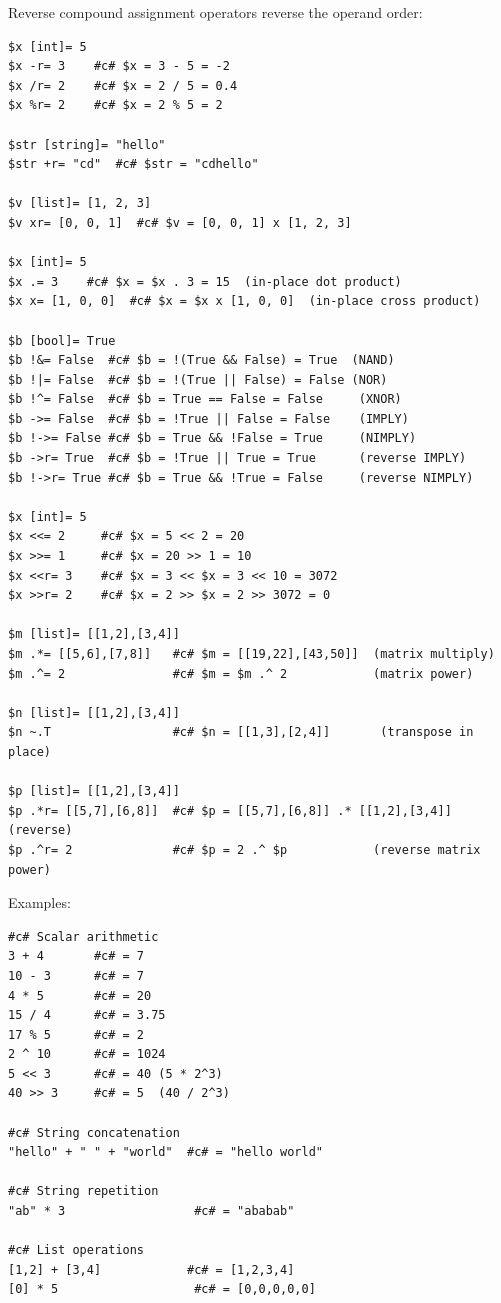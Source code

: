 \documentclass{report}
\begin{document}
Reverse compound assignment operators reverse the operand order:
\begin{verbatim}
$x [int]= 5
$x -r= 3    #c# $x = 3 - 5 = -2
$x /r= 2    #c# $x = 2 / 5 = 0.4
$x %r= 2    #c# $x = 2 % 5 = 2

$str [string]= "hello"
$str +r= "cd"  #c# $str = "cdhello"

$v [list]= [1, 2, 3]
$v xr= [0, 0, 1]  #c# $v = [0, 0, 1] x [1, 2, 3]

$x [int]= 5
$x .= 3    #c# $x = $x . 3 = 15  (in-place dot product)
$x x= [1, 0, 0]  #c# $x = $x x [1, 0, 0]  (in-place cross product)

$b [bool]= True
$b !&= False  #c# $b = !(True && False) = True  (NAND)
$b !|= False  #c# $b = !(True || False) = False (NOR)
$b !^= False  #c# $b = True == False = False     (XNOR)
$b ->= False  #c# $b = !True || False = False    (IMPLY)
$b !->= False #c# $b = True && !False = True     (NIMPLY)
$b ->r= True  #c# $b = !True || True = True      (reverse IMPLY)
$b !->r= True #c# $b = True && !True = False     (reverse NIMPLY)

$x [int]= 5
$x <<= 2     #c# $x = 5 << 2 = 20
$x >>= 1     #c# $x = 20 >> 1 = 10
$x <<r= 3    #c# $x = 3 << $x = 3 << 10 = 3072
$x >>r= 2    #c# $x = 2 >> $x = 2 >> 3072 = 0

$m [list]= [[1,2],[3,4]]
$m .*= [[5,6],[7,8]]   #c# $m = [[19,22],[43,50]]  (matrix multiply)
$m .^= 2               #c# $m = $m .^ 2            (matrix power)

$n [list]= [[1,2],[3,4]]
$n ~.T                 #c# $n = [[1,3],[2,4]]       (transpose in place)

$p [list]= [[1,2],[3,4]]
$p .*r= [[5,7],[6,8]]  #c# $p = [[5,7],[6,8]] .* [[1,2],[3,4]]  (reverse)
$p .^r= 2              #c# $p = 2 .^ $p            (reverse matrix power)
\end{verbatim}

Examples:
\begin{verbatim}
#c# Scalar arithmetic
3 + 4       #c# = 7
10 - 3      #c# = 7
4 * 5       #c# = 20
15 / 4      #c# = 3.75
17 % 5      #c# = 2
2 ^ 10      #c# = 1024
5 << 3      #c# = 40 (5 * 2^3)
40 >> 3     #c# = 5  (40 / 2^3)

#c# String concatenation
"hello" + " " + "world"  #c# = "hello world"

#c# String repetition
"ab" * 3                  #c# = "ababab"

#c# List operations
[1,2] + [3,4]            #c# = [1,2,3,4]
[0] * 5                   #c# = [0,0,0,0,0]
\end{verbatim}
\end{document}
